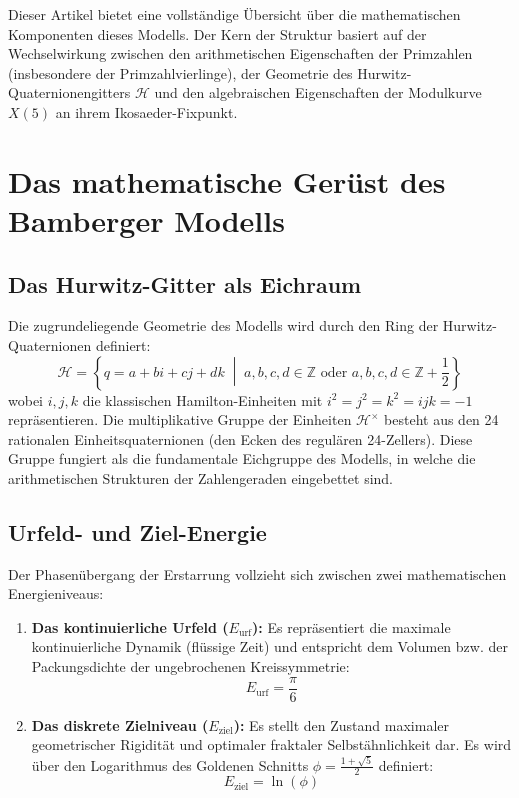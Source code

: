 \documentclass[11pt,a4paper]{article}
\theoremstyle{plain}
\theoremstyle{definition}
\numberwithin{equation}{section}
\begin{document}
Dieser Artikel bietet eine vollständige Übersicht über die mathematischen Komponenten dieses Modells. Der Kern der Struktur basiert auf der Wechselwirkung zwischen den arithmetischen Eigenschaften der Primzahlen (insbesondere der Primzahlvierlinge), der Geometrie des Hurwitz-Quaternionengitters $\mathcal{H}$ und den algebraischen Eigenschaften der Modulkurve $X(5)$ an ihrem Ikosaeder-Fixpunkt.

\section{Das mathematische Gerüst des Bamberger Modells}

\subsection{Das Hurwitz-Gitter als Eichraum}
Die zugrundeliegende Geometrie des Modells wird durch den Ring der Hurwitz-Quaternionen definiert:
\begin{equation}
\mathcal{H} = \left\{ q = a + bi + cj + dk \;\middle|\; a,b,c,d \in \mathbb{Z} \text{ oder } a,b,c,d \in \mathbb{Z} + \frac{1}{2} \right\}
\end{equation}
wobei $i,j,k$ die klassischen Hamilton-Einheiten mit $i^2=j^2=k^2=ijk=-1$ repräsentieren. Die multiplikative Gruppe der Einheiten $\mathcal{H}^{\times}$ besteht aus den 24 rationalen Einheitsquaternionen (den Ecken des regulären 24-Zellers). Diese Gruppe fungiert als die fundamentale Eichgruppe des Modells, in welche die arithmetischen Strukturen der Zahlengeraden eingebettet sind.

\subsection{Urfeld- und Ziel-Energie}
Der Phasenübergang der Erstarrung vollzieht sich zwischen zwei mathematischen Energieniveaus:
\begin{enumerate}
    \item \textbf{Das kontinuierliche Urfeld ($E_{\text{urf}}$):} Es repräsentiert die maximale kontinuierliche Dynamik (flüssige Zeit) und entspricht dem Volumen bzw. der Packungsdichte der ungebrochenen Kreissymmetrie:
    \begin{equation}
    E_{\text{urf}} = \frac{\pi}{6}
    \end{equation}
    \item \textbf{Das diskrete Zielniveau ($E_{\text{ziel}}$):} Es stellt den Zustand maximaler geometrischer Rigidität und optimaler fraktaler Selbstähnlichkeit dar. Es wird über den Logarithmus des Goldenen Schnitts $\phi = \frac{1+\sqrt{5}}{2}$ definiert:
    \begin{equation}
    E_{\text{ziel}} = \ln(\phi)
    \end{equation}
\end{enumerate}
\end{document}

